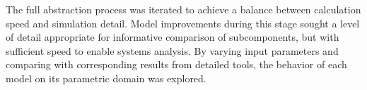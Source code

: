 
The full abstraction process was iterated to achieve a balance between 
calculation speed and simulation detail. Model improvements during this stage 
sought a level of detail appropriate for informative comparison of subcomponents, but 
with sufficient speed to enable systems analysis. 
By varying input parameters and comparing with corresponding results from 
detailed tools, the behavior of each model on its parametric domain was 
explored.

